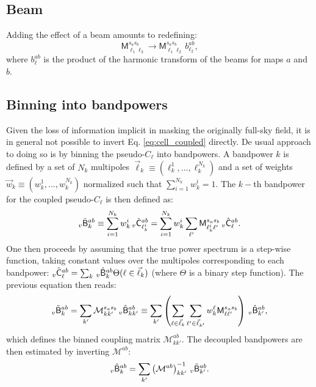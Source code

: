\documentclass[a4paper,10pt]{article}
\begin{document}
\subsection{Beam}
  Adding the effect of a beam amounts to redefining:
  \begin{equation}
    \mathsf{M}^{s_as_b}_{\ell_1\ell_2}\rightarrow\mathsf{M}^{s_as_b}_{\ell_1\ell_2}\,b^{ab}_{\ell_2},
  \end{equation}
  where $b^{ab}_\ell$ is the product of the harmonic transform of the beams for maps $a$ and $b$.
    
\subsection{Binning into bandpowers}
  Given the loss of information implicit in masking the originally full-sky field, it is in general not possible to invert Eq. \ref{eq:cell_coupled} directly. De usual approach to doing so is by binning the pseudo-$C_\ell$ into bandpowers. A bandpower $k$ is defined by a set of $N_k$ multipoles $\vec{\ell}_k\equiv(\ell_k^1,...,\ell_k^{N_k})$ and a set of weights $\vec{w}_k\equiv(w_k^1,...,w_k^{N_k})$ normalized such that $\sum_{i=1}^{N_k}w_k^i=1$. The $k-$th bandpower for the coupled pseudo-$C_\ell$ is then defined as:
  \begin{equation}
    _v\tilde{\sf B}^{ab}_k\equiv\sum_{i=1}^{N_k}w_k^i\,_v\tilde{\sf C}^{ab}_{\ell_k^i}
    =\sum_{i=1}^{N_k}w_k^i\sum_{\ell'}{\sf M}^{s_as_b}_{\ell_k^i\ell'}\,_v\hat{\sf C}^{ab}_\ell.
  \end{equation}
  One then proceeds by assuming that the true power spectrum is a step-wise function, taking constant values over the multipoles corresponding to each bandpower: $_v\hat{\sf C}^{ab}_\ell=\sum_k\,_v\hat{\sf B}^{ab}_k\Theta(\ell\in\vec{\ell}_k)$ (where $\Theta$ is a binary step function). The previous equation then reads:
  \begin{equation}
   _v\tilde{\sf B}^{ab}_k=\sum_{k'}\mathcal{M}^{s_as_b}_{kk'}\,_v\hat{\sf B}^{ab}_{kk'}\equiv\sum_{k'}\left(\sum_{\ell\in\vec{\ell}_k}\sum_{\ell'\in\vec{\ell}_{k'}}w_k^\ell{\sf M}^{s_as_b}_{\ell\ell'}\right)\,_v\hat{\sf B}^{ab}_{k'},
  \end{equation}
  which defines the binned coupling matrix $\mathcal{M}^{ab}_{kk'}$. The decoupled bandpowers are then estimated by inverting $\mathcal{M}^{ab}$:
  \begin{equation}
    _v\hat{\sf B}^{ab}_k=\sum_{k'}\left(\mathcal{M}^{ab}\right)^{-1}_{kk'}\,_v\tilde{\sf B}^{ab}_{k'}.
  \end{equation}
\end{document}
